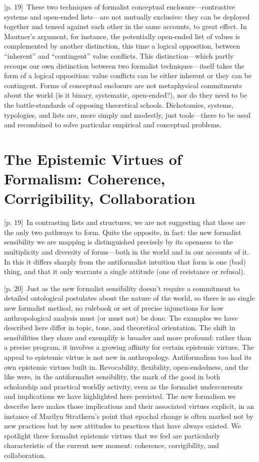 \documentclass[10pt,a4paper]{article}
\begin{document}
{\scriptsize\color{gray} [p. 19]}\ These two techniques of formalist conceptual enclosure—contrastive systems and open-ended lists—are not mutually exclusive: they can be deployed together and tensed against each other in the same accounts, to great effect. In Mautner’s argument, for instance, the potentially open-ended list of values is complemented by another distinction, this time a logical opposition, between “inherent” and “contingent” value conflicts. This distinction—which partly recoups our own distinction between two formalist techniques—itself takes the form of a logical opposition: value conflicts can be either inherent or they can be contingent. Forms of conceptual enclosure are not metaphysical commitments about the world (is it binary, systematic, open-ended?), nor do they need to be the battle-standards of opposing theoretical schools. Dichotomies, systems, typologies, and lists are, more simply and modestly, just tools—there to be used and recombined to solve particular empirical and conceptual problems.\par
{}\section*{The Epistemic Virtues of Formalism: Coherence, Corrigibility, Collaboration}
{\scriptsize\color{gray} [p. 19]}\ In contrasting lists and structures, we are not suggesting that these are the only two pathways to form. Quite the opposite, in fact: the new formalist sensibility we are mapping is distinguished precisely by its openness to the multiplicity and diversity of forms—both in the world and in our accounts of it. In this it differs sharply from the antiformalist intuition that form is one (bad) thing, and that it only warrants a single attitude (one of resistance or refusal).\par
{\scriptsize\color{gray} [p. 20]}\ Just as the new formalist sensibility doesn’t require a commitment to detailed ontological postulates about the nature of the world, so there is no single new formalist method, no rulebook or set of precise injunctions for how anthropological analysis must (or must not) be done. The examples we have described here differ in topic, tone, and theoretical orientation. The shift in sensibilities they share and exemplify is broader and more profound: rather than a precise program, it involves a growing affinity for certain epistemic virtues. The appeal to epistemic virtue is not new in anthropology. Antiformalism too had its own epistemic virtues built in. Revocability, flexibility, open-endedness, and the like were, in the antiformalist sensibility, the mark of the good in both scholarship and practical worldly activity, even as the formalist undercurrents and implications we have highlighted here persisted. The new formalism we describe here makes those implications and their associated virtues explicit, in an instance of Marilyn Strathern’s point that epochal change is often marked not by new practices but by new attitudes to practices that have always existed. We spotlight three formalist epistemic virtues that we feel are particularly characteristic of the current new moment: coherence, corrigibility, and collaboration.\par
\end{document}
